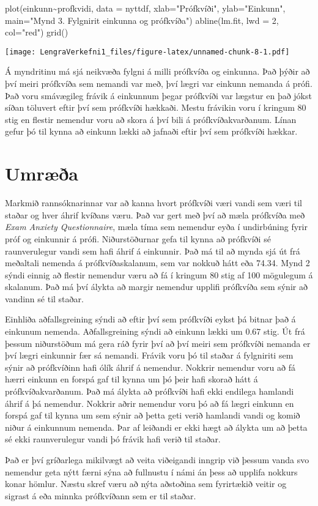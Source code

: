 \documentclass[
]{article}
\newenvironment{Shaded}{\begin{snugshade}}{\end{snugshade}}
\newcommand{\AttributeTok}[1]{\textcolor[rgb]{0.77,0.63,0.00}{#1}}
\newcommand{\DecValTok}[1]{\textcolor[rgb]{0.00,0.00,0.81}{#1}}
\newcommand{\FunctionTok}[1]{\textcolor[rgb]{0.00,0.00,0.00}{#1}}
\newcommand{\NormalTok}[1]{#1}
\newcommand{\SpecialCharTok}[1]{\textcolor[rgb]{0.00,0.00,0.00}{#1}}
\newcommand{\StringTok}[1]{\textcolor[rgb]{0.31,0.60,0.02}{#1}}
\begin{document}
\begin{Shaded}
\begin{Highlighting}[]
\FunctionTok{plot}\NormalTok{(einkunn}\SpecialCharTok{\textasciitilde{}}\NormalTok{profkvidi, }\AttributeTok{data =}\NormalTok{ nyttdf, }\AttributeTok{xlab=}\StringTok{"Prófkvíði"}\NormalTok{, }\AttributeTok{ylab=}\StringTok{"Einkunn"}\NormalTok{, }\AttributeTok{main=}\StringTok{"Mynd 3. Fylgnirit  einkunna og prófkvíða"}\NormalTok{)}
\FunctionTok{abline}\NormalTok{(lm.fit, }\AttributeTok{lwd =} \DecValTok{2}\NormalTok{, }\AttributeTok{col=}\StringTok{"red"}\NormalTok{)}
\FunctionTok{grid}\NormalTok{()}
\end{Highlighting}
\end{Shaded}

\texttt{[image: LengraVerkefni1\_files/figure-latex/unnamed-chunk-8-1.pdf]}

Á myndritinu má sjá neikvæða fylgni á milli prófkvíða og einkunna. Það
þýðir að því meiri prófkvíða sem nemandi var með, því lægri var einkunn
nemanda á prófi. Það voru smávægileg frávik á einkunnum þegar prófkvíði
var lægstur en það jókst síðan töluvert eftir því sem prófkvíði hækkaði.
Mestu frávikin voru í kringum 80 stig en flestir nemendur voru að skora
á því bili á prófkvíðakvarðanum. Línan gefur þó til kynna að einkunn
lækki að jafnaði eftir því sem prófkvíði hækkar.

\hypertarget{umruxe6uxf0a}{%
\section{Umræða}\label{umruxe6uxf0a}}

Markmið rannsóknarinnar var að kanna hvort prófkvíði væri vandi sem væri
til staðar og hver áhrif kvíðans væru. Það var gert með því að mæla
prófkvíða með \emph{Exam Anxiety Questionnaire}, mæla tíma sem nemendur
eyða í undirbúning fyrir próf og einkunnir á prófi. Niðurstöðurnar gefa
til kynna að prófkvíði sé raunverulegur vandi sem hafi áhrif á
einkunnir. Það má til að mynda sjá út frá meðaltali nemenda á
prófkvíðaskalanum, sem var nokkuð hátt eða 74.34. Mynd 2 sýndi einnig að
flestir nemendur væru að fá í kringum 80 stig af 100 mögulegum á
skalanum. Það má því álykta að margir nemendur upplifi prófkvíða sem
sýnir að vandinn sé til staðar.

Einhliða aðfallsgreining sýndi að eftir því sem prófkvíði eykst þá
bitnar það á einkunum nemenda. Aðfallsgreining sýndi að einkunn lækki um
0.67 stig. Út frá þessum niðurstöðum má gera ráð fyrir því að því meiri
sem prófkvíði nemanda er því lægri einkunnir fær sá nemandi. Frávik voru
þó til staðar á fylgniriti sem sýnir að prófkvíðinn hafi ólík áhrif á
nemendur. Nokkrir nemendur voru að fá hærri einkunn en forspá gaf til
kynna um þó þeir hafi skorað hátt á prófkvíðakvarðanum. Það má álykta að
prófkvíði hafi ekki endilega hamlandi áhrif á þá nemendur. Nokkrir aðrir
nemendur voru þó að fá lægri einkunn en forspá gaf til kynna um sem
sýnir að þetta geti verið hamlandi vandi og komið niður á einkunnum
nemenda. Þar af leiðandi er ekki hægt að álykta um að þetta sé ekki
raunverulegur vandi þó frávik hafi verið til staðar.

Það er því gríðarlega mikilvægt að veita viðeigandi inngrip við þessum
vanda svo nemendur geta nýtt færni sýna að fullnustu í námi án þess að
upplifa nokkurs konar hömlur. Næstu skref væru að nýta aðstoðina sem
fyrirtækið veitir og sigrast á eða minnka prófkvíðann sem er til staðar.
\end{document}

